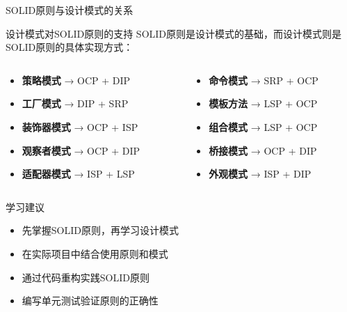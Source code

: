 \documentclass[UTF8,aspectratio=169]{beamer}
\begin{document}
\begin{frame}{SOLID原则与设计模式的关系}
    \begin{ytublock}{设计模式对SOLID原则的支持}
        SOLID原则是设计模式的基础，而设计模式则是SOLID原则的具体实现方式：
    \end{ytublock}

    \begin{columns}
        \begin{column}{0.5\textwidth}
            \begin{itemize}
                \item \textbf{策略模式} → OCP + DIP
                \item \textbf{工厂模式} → DIP + SRP
                \item \textbf{装饰器模式} → OCP + ISP
                \item \textbf{观察者模式} → OCP + DIP
                \item \textbf{适配器模式} → ISP + LSP
            \end{itemize}
        \end{column}
        \begin{column}{0.5\textwidth}
            \begin{itemize}
                \item \textbf{命令模式} → SRP + OCP
                \item \textbf{模板方法} → LSP + OCP
                \item \textbf{组合模式} → LSP + OCP
                \item \textbf{桥接模式} → OCP + DIP
                \item \textbf{外观模式} → ISP + DIP
            \end{itemize}
        \end{column}
    \end{columns}

    \begin{alertytublock}{学习建议}
        \begin{itemize}
            \item 先掌握SOLID原则，再学习设计模式
            \item 在实际项目中结合使用原则和模式
            \item 通过代码重构实践SOLID原则
            \item 编写单元测试验证原则的正确性
        \end{itemize}
    \end{alertytublock}
\end{frame}
\end{document}
